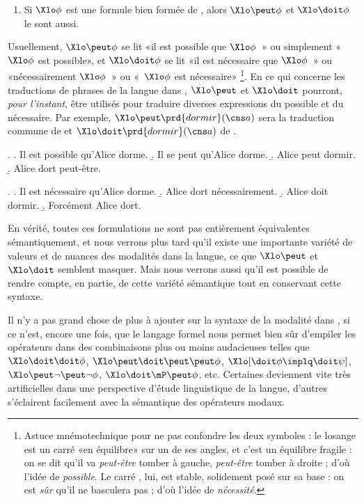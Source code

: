 \begin{defi}
\begin{enumerate}[resume*=RglSyn1] %
\item Si $\Xlo\phi$ est une formule bien formée de {\LO}, alors $\Xlo\peut\phi$
et $\Xlo\doit\phi$ le sont aussi.
\setcounter{RglSynt}{\value{enumi}}
\end{enumerate}
\end{defi}

Usuellement, $\Xlo\peut\phi$ se lit  «il est possible que $\Xlo\phi$~» ou
simplement «~$\Xlo\phi$ est possible», et  $\Xlo\doit\phi$ se lit «il est
nécessaire que $\Xlo\phi$~» ou «nécessairement $\Xlo\phi$~» ou «~$\Xlo\phi$
est nécessaire»%
\footnote{Astuce mnémotechnique pour ne pas confondre les deux
  symboles : le losange {\Xlo\peut} est un carré «en équilibre» sur
  un de ses angles, et c'est un équilibre fragile : on se dit qu'il va
  \emph{peut-être} tomber à gauche, \emph{peut-être} tomber à droite ;
  d'où l'idée de \emph{possible}.  Le carré {\Xlo\doit}, lui, est stable,
  solidement posé sur sa base : on est \emph{sûr} qu'il ne basculera pas ;
  d'où l'idée de \emph{nécessité}.}.
En ce qui concerne les traductions de phrases de la langue dans {\LO}, $\Xlo\peut$ et $\Xlo\doit$ pourront, \emph{pour l'instant}, être utilisés pour traduire diverses expressions du possible et du nécessaire. Par exemple, \(\Xlo\peut\prd{dormir}(\cns a)\) sera la traduction commune de \Next[a--d] et 
\(\Xlo\doit\prd{dormir}(\cns a)\) de \NNext[a--d].

\ex. 
\a. Il est possible qu'Alice dorme.
\b. Il se peut qu'Alice dorme.
\b. Alice peut dormir.
\b. Alice dort peut-être.

\ex. 
\a. Il est nécessaire qu'Alice dorme.
\b. Alice dort nécessairement.
\b. Alice doit dormir.
\b. Forcément Alice dort.


En vérité, toutes ces formulations ne sont pas entièrement équivalentes sémantiquement, et nous verrons plus tard qu'il existe une importante variété de valeurs et de nuances des modalités dans la langue, ce que $\Xlo\peut$ et $\Xlo\doit$ semblent masquer.  Mais nous verrons aussi qu'il est possible de rendre compte, en partie,  de cette variété sémantique tout en conservant cette syntaxe.

Il n'y a pas grand chose de plus à ajouter sur la syntaxe de la modalité dans {\LO}, si ce n'est, encore une fois, que le langage formel nous permet bien sûr d'empiler les opérateurs dans des combinaisons plus ou moins audacieuses telles que 
$\Xlo\doit\doit\phi$, $\Xlo\peut\doit\peut\peut\phi$,
$\Xlo[\doit\phi\implq\doit\psi]$,
$\Xlo\peut\neg\peut\neg\phi$, $\Xlo\doit\mP\peut\phi$, 
etc.  
Certaines deviennent vite très artificielles dans une perspective d'étude linguistique de la langue, d'autres s'éclairent facilement avec la sémantique des opérateurs modaux.



